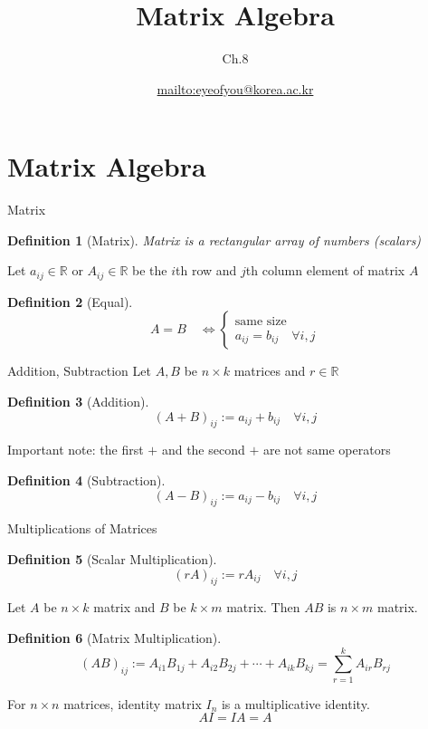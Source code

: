 \documentclass[a4paper,11pt]{article}
\author[조남운]{\url{mailto:eyeofyou@korea.ac.kr}}
\title{Matrix Algebra}
\subtitle{Ch.8}
\newtheorem{defn}{Definition}
\begin{document}
	
\maketitle


\section{Matrix Algebra} %
\label{sec:matrix_algebra}
\begin{frame}[t]{Matrix}
	\begin{defn}
		[Matrix]
		Matrix is a rectangular array of numbers (scalars)
	\end{defn}
	
	Let $a_{ij}\in \mathbb{R}$ or $A_{ij}\in\mathbb{R}$ be the $i$th row and $j$th column element of matrix $A$
	
	\begin{defn}
		[Equal]
		\[
			A=B\quad \iff \begin{cases}
				\text{same size}\\
				a_{ij}=b_{ij} \quad \forall i,j
			\end{cases}
		\]
	\end{defn}
	
\end{frame}

\begin{frame}[t]{Addition, Subtraction}
	Let $A,B$ be $n\times k$ matrices and $r\in \mathbb{R}$
	\begin{defn}
		[Addition]
		\[
			(A+B)_{ij} := a_{ij}+b_{ij}\quad\forall i,j
		\]
	\end{defn}
	Important note: the first $+$ and the second $+$ are not same operators
	
	\begin{defn}
		[Subtraction]
		\[
			(A-B)_{ij} := a_{ij}-b_{ij}\quad\forall i,j
		\]
	\end{defn}
\end{frame}

\begin{frame}[t]{Multiplications of Matrices}
	\begin{defn}
		[Scalar Multiplication]
		\[
			(rA)_{ij} := r A_{ij}\quad\forall i,j
		\]
	\end{defn}
	Let $A$ be $n\times k$ matrix and $B$ be $k\times m$ matrix. Then $AB$ is $n\times m$ matrix.
	\begin{defn}
		[Matrix Multiplication]
		\[
			(AB)_{ij}:=A_{i1}B_{1j}+A_{i2}B_{2j}+\cdots+A_{ik}B_{kj}= \sum_{r=1}^k A_{ir}B_{rj}
		\]
	\end{defn}
	For $n\times n$ matrices, identity matrix $I_n$ is a multiplicative identity. 
	\[
		AI = IA = A
	\]
\end{frame}
\end{document}
